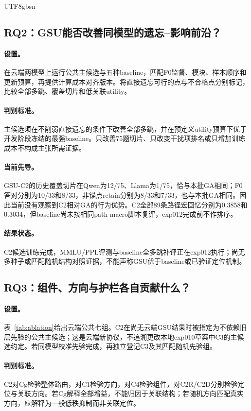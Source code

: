 \documentclass[sigconf,anonymous,review]{acmart}
\begin{document}
\begin{CJK*}{UTF8}{gbsn}
\subsection{RQ2：GSU能否改善同模型的遗忘--影响前沿？}
\paragraph{设置。}在云端两模型上运行公共主候选与五种baseline，匹配F0监督、模块、样本顺序和更新预算，再提供计算成本对齐版本。将直接遗忘可行的点与不合格点分别标记，比较全部多跳、覆盖切片和低关联utility。
\paragraph{判别标准。}主候选须在不削弱直接遗忘的条件下改善全部多跳，并在预定义utility预算下优于开发阶段冻结的最强baseline。只改善75题切片、只改变干扰项排名或只增加训练成本不构成主张所需证据。
\paragraph{当前先导。}GSU-C2的历史覆盖切片在Qwen为12/75、Llama为1/75，恰与本批GA相同；F0答对分别为10/33和8/33，非锚点retain分别为8/33和7/33，也与本批GA相同。因此当前没有观察到C2相对GA的行为优势。C2全部89条路径宏回忆分别为0.3858和0.3034，但baseline尚未按相同path-macro脚本复评，exp012完成前不作排序。
\paragraph{结果状态。}C2候选训练完成，MMLU/PPL评测与baseline全多跳补评正在exp012执行；尚无多种子或匹配随机结构对照证据，不能声称GSU优于baseline或已验证定位机制。

\subsection{RQ3：组件、方向与护栏各自贡献什么？}
\paragraph{设置。}表~\ref{tab:ablation}给出云端公共七组。C2在尚无云端GSU结果时被指定为不依赖旧层先验的公共主候选；这是云端新协议，不追溯更改本地exp010草案中C3的主候选约定。若同模型校准先验完成，再独立登记C3及其匹配随机先验组。
\paragraph{判别标准。}C2对Cg检验整体路由，对C1检验方向，对C4检验组件，对C2R/C2D分别检验定位与关联方向。若Cg解释全部增益，不能归因于关联结构；若随机方向匹配真实方向，应解释为一般低秩抑制而非关联定位。

\end{CJK*}
\end{document}
